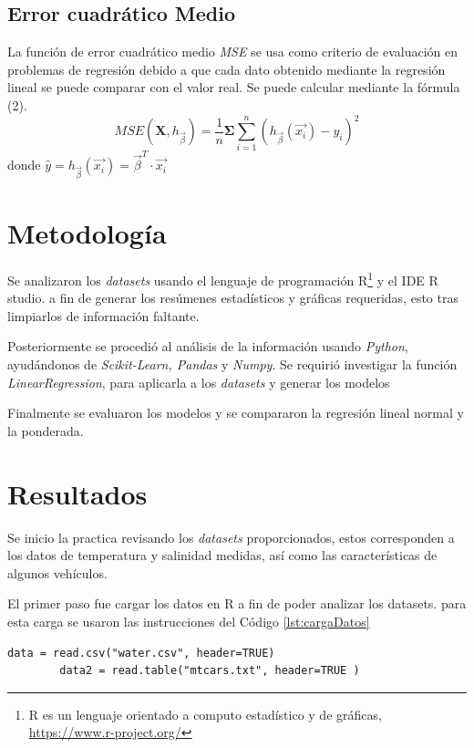 \documentclass[sigconf]{acmart}
\begin{document}
	\subsection{Error cuadrático Medio}
	La función de error cuadrático medio \textit{MSE} se usa como criterio de evaluación en problemas de regresión debido a que cada dato obtenido mediante la regresión lineal se puede comparar con el valor real. Se puede calcular mediante la fórmula (2).
	\begin{equation}
		MSE\left(\mathbf{X},h_{\overrightarrow{\beta}}\right)  =
		\frac{1}{n}   \mathbf{\Sigma} \sum_{i=1}^n \left(h_{\overrightarrow{\beta}}\left(\overrightarrow{x_{i}}\right)-y_{i}\right)^2
	\end{equation}
	donde $\hat{y}$$=h_{\overrightarrow{\beta}}\left(\overrightarrow{x_{i}}\right)=\overrightarrow{\beta}^T \cdot \overrightarrow{x_{i}}$
	\section{Metodología}
	
	Se analizaron los \textit{datasets} usando el lenguaje de programación R\footnote{R es un lenguaje orientado a computo estadístico y de gráficas, \url{https://www.r-project.org/} } y el IDE R studio. a fin de generar los resúmenes estadísticos y gráficas requeridas, esto tras limpiarlos de información faltante.
	
	Posteriormente se procedió al análisis de la información usando \textit{Python}, ayudándonos de \textit{Scikit-Learn, Pandas} y \textit{Numpy}.
	Se requirió investigar la función \textit{LinearRegression}, para aplicarla a los \textit{datasets} y generar los modelos
	
	Finalmente se evaluaron los modelos y se compararon la regresión lineal normal y la ponderada.
	
	\section{Resultados}
	
	Se inicio la practica revisando los \textit{datasets} proporcionados, estos corresponden a los datos de temperatura y salinidad medidas, así como las características de algunos vehículos. 
	
	El primer paso fue cargar los datos en R a fin de poder analizar los datasets. para esta carga se usaron las instrucciones del Código \ref{lst:cargaDatos}
	
	\begin{lstlisting}[caption=lectura de los datos,breaklines,label=lst:cargaDatos]
		data = read.csv("water.csv", header=TRUE)
		data2 = read.table("mtcars.txt", header=TRUE )
	\end{lstlisting}
	
\end{document}
